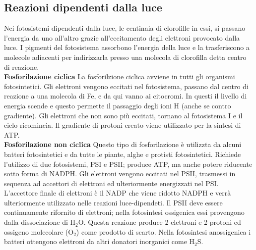 \subsection{Reazioni dipendenti dalla luce}
Nei fotosistemi dipendenti dalla luce, le centinaia di clorofille in essi, si passano l'energia da uno all'altro grazie all'eccitamento degli elettroni provocato dalla luce. I pigmenti del fotosistema assorbono l'energia della luce e la trasferiscono a molecole adiacenti per indirizzarla presso una molecola di clorofilla detta centro di reazione. 
\\\textbf{Fosforilazione ciclica}
La fosforilzione ciclica avviene in tutti gli organismi fotosintetici. Gli elettroni vengono eccitati nel fotosistema, passano dal centro di reazione a una molecola di Fe, e da qui vanno ai citocromi. In questi il livello di energia scende e questo permette il passaggio degli ioni H\ap{+} (anche se contro gradiente). Gli elettroni che non sono pi\`u eccitati, tornano al fotosistema I e il ciclo ricomincia. Il gradiente di protoni creato viene utilizzato per la sintesi di ATP.
\\\textbf{Fosforilazione non ciclica}
Questo tipo di fosforilazione \`e utilizzta da alcuni  batteri fotosintetici e da tutte le piante, alghe e protisti fotosintetici. Richiede l'utilizzo di due fotosistemi, PSI e PSII; produce ATP, ma anche potere riducente sotto forma di NADPH. Gli elettroni vengono eccitati nel PSII, trasmessi in sequenza ad accettori di elettroni ed ulteriormente energizzati nel PSI. L'accettore finale di elettroni \`e il NADP\ap{+} che viene ridotto NADPH e verr\`a ulteriormente utilizzato nelle reazioni luce-dipendeti. Il PSII deve essere continuamente rifornito di elettroni; nella fotosintesi ossigenica essi provengono dalla dissociazione di H$_2$O. Questa reazione produce 2 elettroni e 2 protoni ed ossigeno molecolare (O$_2$) come prodotto di scarto. Nella fotosintesi anossigenica i batteri ottengono elettroni da altri donatori inorganici come H$_2$S.
